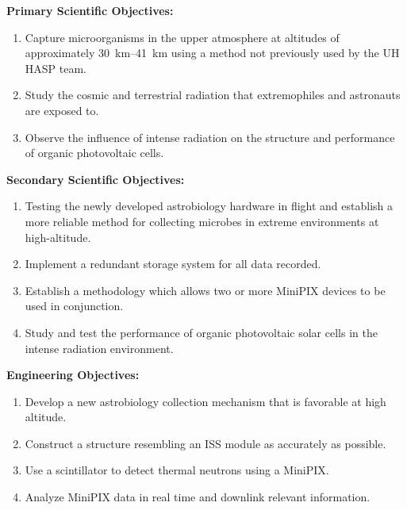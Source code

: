 \noindent \textbf {Primary Scientific Objectives:}
\begin{enumerate}
\item Capture microorganisms in the upper atmosphere at altitudes of approximately \SIrange{30}{41}{\kilo\meter} using a method not previously used by the UH HASP team. 
\item Study the cosmic and terrestrial radiation that extremophiles and astronauts are exposed to.
\item Observe the influence of intense radiation on the structure and performance of organic photovoltaic cells.
\end{enumerate}

\noindent \textbf {Secondary Scientific Objectives:}
\begin{enumerate}
\item Testing the newly developed astrobiology hardware in flight and establish a more reliable method for collecting microbes in extreme environments at high-altitude.
\item Implement a redundant storage system for all data recorded.
\item Establish a methodology which allows two or more MiniPIX devices to be used in conjunction.
\item Study and test the performance of organic photovoltaic solar cells in the intense radiation environment.
\end{enumerate}

\noindent \textbf {Engineering Objectives:}
\begin{enumerate}
\item Develop a new astrobiology collection mechanism that is favorable at high altitude.
\item Construct a structure resembling an ISS module as accurately as possible.
\item Use a scintillator to detect thermal neutrons using a MiniPIX.
\item Analyze MiniPIX data in real time and downlink relevant information.
\end{enumerate}


